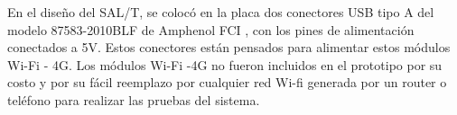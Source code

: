 En el diseño del SAL/T, se colocó en la placa dos conectores USB tipo A del modelo 87583-2010BLF de Amphenol FCI \cite{87583-2010BLF}, con los pines de alimentación conectados a 5V. Estos conectores están pensados para alimentar estos módulos Wi-Fi - 4G. Los módulos Wi-Fi -4G no fueron incluidos en el prototipo por su costo y por su fácil reemplazo por cualquier red Wi-fi generada por un router o teléfono para realizar las pruebas del sistema. 
